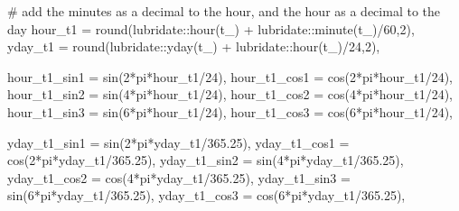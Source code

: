 \documentclass[
  letterpaper,
  DIV=11,
  numbers=noendperiod]{scrartcl}
\newenvironment{Shaded}{\begin{snugshade}}{\end{snugshade}}
\newcommand{\AttributeTok}[1]{\textcolor[rgb]{0.40,0.45,0.13}{#1}}
\newcommand{\CommentTok}[1]{\textcolor[rgb]{0.37,0.37,0.37}{#1}}
\newcommand{\DecValTok}[1]{\textcolor[rgb]{0.68,0.00,0.00}{#1}}
\newcommand{\FloatTok}[1]{\textcolor[rgb]{0.68,0.00,0.00}{#1}}
\newcommand{\FunctionTok}[1]{\textcolor[rgb]{0.28,0.35,0.67}{#1}}
\newcommand{\NormalTok}[1]{\textcolor[rgb]{0.00,0.23,0.31}{#1}}
\newcommand{\SpecialCharTok}[1]{\textcolor[rgb]{0.37,0.37,0.37}{#1}}
\begin{document}
\begin{Shaded}
\begin{Highlighting}[]
    \CommentTok{\# add the minutes as a decimal to the hour, and the hour as a decimal to the day}
    \AttributeTok{hour\_t1 =} \FunctionTok{round}\NormalTok{(lubridate}\SpecialCharTok{::}\FunctionTok{hour}\NormalTok{(t\_) }\SpecialCharTok{+}\NormalTok{ lubridate}\SpecialCharTok{::}\FunctionTok{minute}\NormalTok{(t\_)}\SpecialCharTok{/}\DecValTok{60}\NormalTok{,}\DecValTok{2}\NormalTok{),}
    \AttributeTok{yday\_t1 =} \FunctionTok{round}\NormalTok{(lubridate}\SpecialCharTok{::}\FunctionTok{yday}\NormalTok{(t\_) }\SpecialCharTok{+}\NormalTok{ lubridate}\SpecialCharTok{::}\FunctionTok{hour}\NormalTok{(t\_)}\SpecialCharTok{/}\DecValTok{24}\NormalTok{,}\DecValTok{2}\NormalTok{),}
    
    \AttributeTok{hour\_t1\_sin1 =} \FunctionTok{sin}\NormalTok{(}\DecValTok{2}\SpecialCharTok{*}\NormalTok{pi}\SpecialCharTok{*}\NormalTok{hour\_t1}\SpecialCharTok{/}\DecValTok{24}\NormalTok{),}
    \AttributeTok{hour\_t1\_cos1 =} \FunctionTok{cos}\NormalTok{(}\DecValTok{2}\SpecialCharTok{*}\NormalTok{pi}\SpecialCharTok{*}\NormalTok{hour\_t1}\SpecialCharTok{/}\DecValTok{24}\NormalTok{),}
    \AttributeTok{hour\_t1\_sin2 =} \FunctionTok{sin}\NormalTok{(}\DecValTok{4}\SpecialCharTok{*}\NormalTok{pi}\SpecialCharTok{*}\NormalTok{hour\_t1}\SpecialCharTok{/}\DecValTok{24}\NormalTok{),}
    \AttributeTok{hour\_t1\_cos2 =} \FunctionTok{cos}\NormalTok{(}\DecValTok{4}\SpecialCharTok{*}\NormalTok{pi}\SpecialCharTok{*}\NormalTok{hour\_t1}\SpecialCharTok{/}\DecValTok{24}\NormalTok{),}
    \AttributeTok{hour\_t1\_sin3 =} \FunctionTok{sin}\NormalTok{(}\DecValTok{6}\SpecialCharTok{*}\NormalTok{pi}\SpecialCharTok{*}\NormalTok{hour\_t1}\SpecialCharTok{/}\DecValTok{24}\NormalTok{),}
    \AttributeTok{hour\_t1\_cos3 =} \FunctionTok{cos}\NormalTok{(}\DecValTok{6}\SpecialCharTok{*}\NormalTok{pi}\SpecialCharTok{*}\NormalTok{hour\_t1}\SpecialCharTok{/}\DecValTok{24}\NormalTok{),}
    
    \AttributeTok{yday\_t1\_sin1 =} \FunctionTok{sin}\NormalTok{(}\DecValTok{2}\SpecialCharTok{*}\NormalTok{pi}\SpecialCharTok{*}\NormalTok{yday\_t1}\SpecialCharTok{/}\FloatTok{365.25}\NormalTok{),}
    \AttributeTok{yday\_t1\_cos1 =} \FunctionTok{cos}\NormalTok{(}\DecValTok{2}\SpecialCharTok{*}\NormalTok{pi}\SpecialCharTok{*}\NormalTok{yday\_t1}\SpecialCharTok{/}\FloatTok{365.25}\NormalTok{),}
    \AttributeTok{yday\_t1\_sin2 =} \FunctionTok{sin}\NormalTok{(}\DecValTok{4}\SpecialCharTok{*}\NormalTok{pi}\SpecialCharTok{*}\NormalTok{yday\_t1}\SpecialCharTok{/}\FloatTok{365.25}\NormalTok{),}
    \AttributeTok{yday\_t1\_cos2 =} \FunctionTok{cos}\NormalTok{(}\DecValTok{4}\SpecialCharTok{*}\NormalTok{pi}\SpecialCharTok{*}\NormalTok{yday\_t1}\SpecialCharTok{/}\FloatTok{365.25}\NormalTok{),}
    \AttributeTok{yday\_t1\_sin3 =} \FunctionTok{sin}\NormalTok{(}\DecValTok{6}\SpecialCharTok{*}\NormalTok{pi}\SpecialCharTok{*}\NormalTok{yday\_t1}\SpecialCharTok{/}\FloatTok{365.25}\NormalTok{),}
    \AttributeTok{yday\_t1\_cos3 =} \FunctionTok{cos}\NormalTok{(}\DecValTok{6}\SpecialCharTok{*}\NormalTok{pi}\SpecialCharTok{*}\NormalTok{yday\_t1}\SpecialCharTok{/}\FloatTok{365.25}\NormalTok{),}
    

\end{Highlighting}
\end{Shaded}
\end{document}
